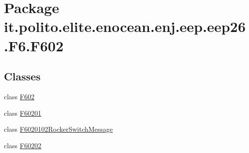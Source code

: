 \hypertarget{namespaceit_1_1polito_1_1elite_1_1enocean_1_1enj_1_1eep_1_1eep26_1_1_f6_1_1_f602}{}\section{Package it.\+polito.\+elite.\+enocean.\+enj.\+eep.\+eep26.\+F6.\+F602}
\label{namespaceit_1_1polito_1_1elite_1_1enocean_1_1enj_1_1eep_1_1eep26_1_1_f6_1_1_f602}
\subsection*{Classes}
\begin{DoxyCompactItemize}
\item 
class \hyperlink{classit_1_1polito_1_1elite_1_1enocean_1_1enj_1_1eep_1_1eep26_1_1_f6_1_1_f602_1_1_f602}{F602}
\item 
class \hyperlink{classit_1_1polito_1_1elite_1_1enocean_1_1enj_1_1eep_1_1eep26_1_1_f6_1_1_f602_1_1_f60201}{F60201}
\item 
class \hyperlink{classit_1_1polito_1_1elite_1_1enocean_1_1enj_1_1eep_1_1eep26_1_1_f6_1_1_f602_1_1_f6020102_rocker_switch_message}{F6020102\+Rocker\+Switch\+Message}
\item 
class \hyperlink{classit_1_1polito_1_1elite_1_1enocean_1_1enj_1_1eep_1_1eep26_1_1_f6_1_1_f602_1_1_f60202}{F60202}
\end{DoxyCompactItemize}
